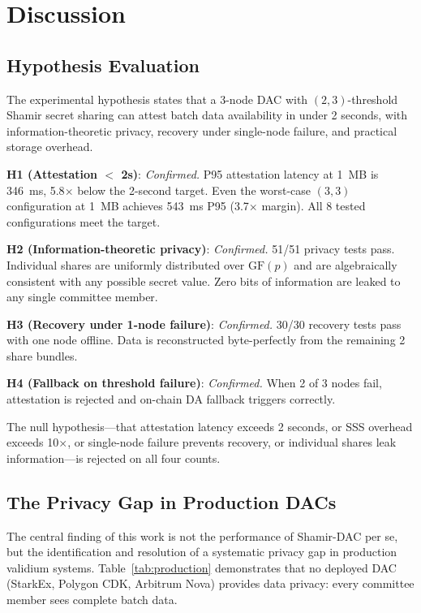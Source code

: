 
\section{Discussion}

\subsection{Hypothesis Evaluation}

The experimental hypothesis states that a 3-node DAC with $(2,3)$-threshold
Shamir secret sharing can attest batch data availability in under 2 seconds,
with information-theoretic privacy, recovery under single-node failure, and
practical storage overhead.

\textbf{H1 (Attestation $<$ 2s)}: \emph{Confirmed.} P95 attestation latency
at 1~MB is 346~ms, 5.8$\times$ below the 2-second target. Even the worst-case
$(3,3)$ configuration at 1~MB achieves 543~ms P95 (3.7$\times$ margin). All 8
tested configurations meet the target.

\textbf{H2 (Information-theoretic privacy)}: \emph{Confirmed.} 51/51 privacy
tests pass. Individual shares are uniformly distributed over $\mathrm{GF}(p)$
and are algebraically consistent with any possible secret value. Zero bits of
information are leaked to any single committee member.

\textbf{H3 (Recovery under 1-node failure)}: \emph{Confirmed.} 30/30 recovery
tests pass with one node offline. Data is reconstructed byte-perfectly from
the remaining 2 share bundles.

\textbf{H4 (Fallback on threshold failure)}: \emph{Confirmed.} When 2 of 3
nodes fail, attestation is rejected and on-chain DA fallback triggers
correctly.

The null hypothesis---that attestation latency exceeds 2 seconds, or SSS
overhead exceeds 10$\times$, or single-node failure prevents recovery, or
individual shares leak information---is rejected on all four counts.

\subsection{The Privacy Gap in Production DACs}

The central finding of this work is not the performance of Shamir-DAC
per se, but the identification and resolution of a systematic privacy gap
in production validium systems. Table~\ref{tab:production} demonstrates
that no deployed DAC (StarkEx, Polygon CDK, Arbitrum Nova) provides data
privacy: every committee member sees complete batch data.

